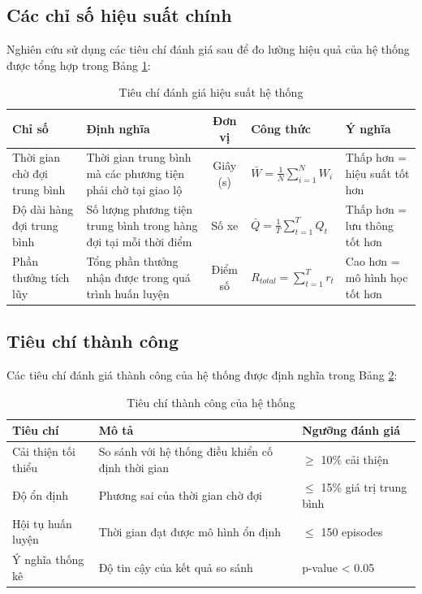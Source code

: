 \subsection{Các chỉ số hiệu suất chính}
Nghiên cứu sử dụng các tiêu chí đánh giá sau để đo lường hiệu quả của hệ thống được tổng hợp trong Bảng \ref{tab:evaluation_criteria}:

\begin{table}[!htp]
\centering
\caption{Tiêu chí đánh giá hiệu suất hệ thống}
\label{tab:evaluation_criteria}
\begin{tabular}{|l|p{4cm}|c|p{3.5cm}|p{3.5cm}|}
\hline
\textbf{Chỉ số} & \textbf{Định nghĩa} & \textbf{Đơn vị} & \textbf{Công thức} & \textbf{Ý nghĩa} \\
\hline
Thời gian chờ đợi trung bình & Thời gian trung bình mà các phương tiện phải chờ tại giao lộ & Giây (s) & $\bar{W} = \frac{1}{N} \sum_{i=1}^{N} W_i$ & Thấp hơn = hiệu suất tốt hơn \\
\hline
Độ dài hàng đợi trung bình & Số lượng phương tiện trung bình trong hàng đợi tại mỗi thời điểm & Số xe & $\bar{Q} = \frac{1}{T} \sum_{t=1}^{T} Q_t$ & Thấp hơn = lưu thông tốt hơn \\
\hline
Phần thưởng tích lũy & Tổng phần thưởng nhận được trong quá trình huấn luyện & Điểm số & $R_{total} = \sum_{t=1}^{T} r_t$ & Cao hơn = mô hình học tốt hơn \\
\hline
\end{tabular}
\end{table}

\subsection{Tiêu chí thành công}
Các tiêu chí đánh giá thành công của hệ thống được định nghĩa trong Bảng \ref{tab:success_criteria}:

\begin{table}[!htp]
\centering
\caption{Tiêu chí thành công của hệ thống}
\label{tab:success_criteria}
\begin{tabular}{|l|p{8cm}|p{4cm}|}
\hline
\textbf{Tiêu chí} & \textbf{Mô tả} & \textbf{Ngưỡng đánh giá} \\
\hline
Cải thiện tối thiểu & So sánh với hệ thống điều khiển cố định thời gian & $\geq$ 10\% cải thiện \\
\hline
Độ ổn định & Phương sai của thời gian chờ đợi & $\leq$ 15\% giá trị trung bình \\
\hline
Hội tụ huấn luyện & Thời gian đạt được mô hình ổn định & $\leq$ 150 episodes \\
\hline
Ý nghĩa thống kê & Độ tin cậy của kết quả so sánh & p-value < 0.05 \\
\hline
\end{tabular}
\end{table}

